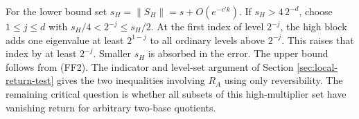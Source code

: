 For the lower bound set $s_H=\|S_H\|=s+O(e^{-c'k})$. If
$s_H>4\,2^{-d}$, choose $1\le j\le d$ with $s_H/4<2^{-j}\le s_H/2$.
At the first index of level $2^{-j}$, the high block adds one
eigenvalue at least $2^{1-j}$ to all ordinary levels above $2^{-j}$.
This raises that index by at least $2^{-j}$. Smaller $s_H$ is absorbed
in the error. The upper bound follows from (FF2). The indicator and
level-set argument of Section \ref{sec:local-return-test} gives the two
inequalities involving $R_A$ using only reversibility.
The remaining critical question is whether all subsets of this
high-multiplier set have vanishing return for arbitrary two-base quotients.
